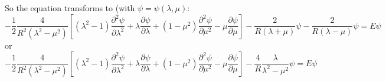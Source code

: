 So the equation transforms to (with $ \psi = \psi(\lambda, \mu) $:
\begin{equation}
-\frac{1}{2}\frac{4}{ R^2 (\lambda^2-\mu^2) }\left[(\lambda^2-1)\frac{\partial^2 \psi}{\partial \lambda^2} + \lambda\frac{\partial \psi}{\partial \lambda} + 
(1 - \mu^2)\frac{\partial^2 \psi}{\partial \mu^2} - \mu\frac{\partial \psi}{\partial \mu} \right] - \frac{2}{R(\lambda+\mu)}\psi - \frac{2}{R(\lambda-\mu)}\psi = E \psi
\end{equation}
or
\begin{equation}\label{SchrFull-1}
-\frac{1}{2}\frac{4}{ R^2 (\lambda^2-\mu^2) }\left[(\lambda^2-1)\frac{\partial^2 \psi}{\partial \lambda^2} + \lambda\frac{\partial \psi}{\partial \lambda} + 
(1 - \mu^2)\frac{\partial^2 \psi}{\partial \mu^2} - \mu\frac{\partial \psi}{\partial \mu} \right] - \frac{4}{R}\frac{\lambda}{\lambda^2-\mu^2}\psi = E \psi
\end{equation}

